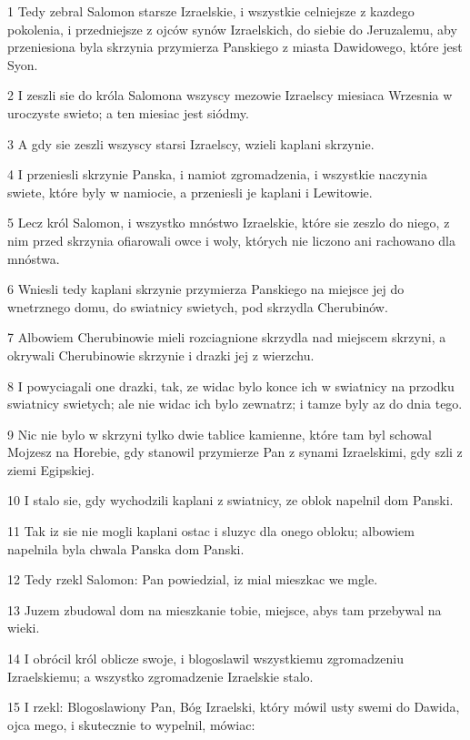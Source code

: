\par 1 Tedy zebral Salomon starsze Izraelskie, i wszystkie celniejsze z kazdego pokolenia, i przedniejsze z ojców synów Izraelskich, do siebie do Jeruzalemu, aby przeniesiona byla skrzynia przymierza Panskiego z miasta Dawidowego, które jest Syon.
\par 2 I zeszli sie do króla Salomona wszyscy mezowie Izraelscy miesiaca Wrzesnia w uroczyste swieto; a ten miesiac jest siódmy.
\par 3 A gdy sie zeszli wszyscy starsi Izraelscy, wzieli kaplani skrzynie.
\par 4 I przeniesli skrzynie Panska, i namiot zgromadzenia, i wszystkie naczynia swiete, które byly w namiocie, a przeniesli je kaplani i Lewitowie.
\par 5 Lecz król Salomon, i wszystko mnóstwo Izraelskie, które sie zeszlo do niego, z nim przed skrzynia ofiarowali owce i woly, których nie liczono ani rachowano dla mnóstwa.
\par 6 Wniesli tedy kaplani skrzynie przymierza Panskiego na miejsce jej do wnetrznego domu, do swiatnicy swietych, pod skrzydla Cherubinów.
\par 7 Albowiem Cherubinowie mieli rozciagnione skrzydla nad miejscem skrzyni, a okrywali Cherubinowie skrzynie i drazki jej z wierzchu.
\par 8 I powyciagali one drazki, tak, ze widac bylo konce ich w swiatnicy na przodku swiatnicy swietych; ale nie widac ich bylo zewnatrz; i tamze byly az do dnia tego.
\par 9 Nic nie bylo w skrzyni tylko dwie tablice kamienne, które tam byl schowal Mojzesz na Horebie, gdy stanowil przymierze Pan z synami Izraelskimi, gdy szli z ziemi Egipskiej.
\par 10 I stalo sie, gdy wychodzili kaplani z swiatnicy, ze oblok napelnil dom Panski.
\par 11 Tak iz sie nie mogli kaplani ostac i sluzyc dla onego obloku; albowiem napelnila byla chwala Panska dom Panski.
\par 12 Tedy rzekl Salomon: Pan powiedzial, iz mial mieszkac we mgle.
\par 13 Juzem zbudowal dom na mieszkanie tobie, miejsce, abys tam przebywal na wieki.
\par 14 I obrócil król oblicze swoje, i blogoslawil wszystkiemu zgromadzeniu Izraelskiemu; a wszystko zgromadzenie Izraelskie stalo.
\par 15 I rzekl: Blogoslawiony Pan, Bóg Izraelski, który mówil usty swemi do Dawida, ojca mego, i skutecznie to wypelnil, mówiac:
